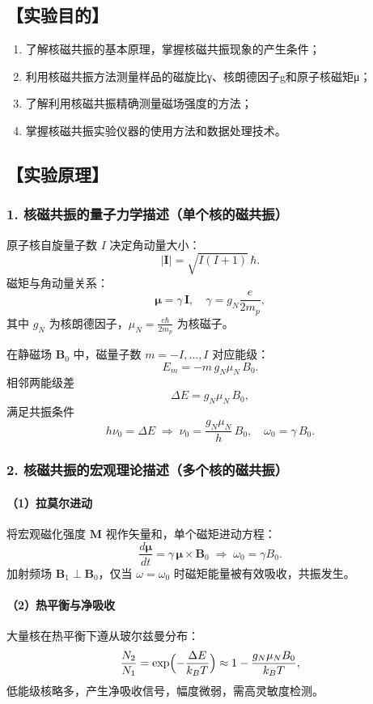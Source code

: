 \documentclass[12pt,a4paper,UTF8]{ctexart}
\begin{document}

\subsection*{【实验目的】}
\begin{enumerate}[(1)]
    \item 了解核磁共振的基本原理，掌握核磁共振现象的产生条件；
    \item 利用核磁共振方法测量样品的磁旋比γ、核朗德因子g和原子核磁矩μ；
    \item 了解利用核磁共振精确测量磁场强度的方法；
    \item 掌握核磁共振实验仪器的使用方法和数据处理技术。
\end{enumerate}

\subsection*{【实验原理】}
\subsubsection*{1. 核磁共振的量子力学描述（单个核的磁共振）}
原子核自旋量子数 \(I\) 决定角动量大小：
\[
|\mathbf{I}| = \sqrt{I(I+1)}\,\hbar.
\]
磁矩与角动量关系：
\[
\boldsymbol{\mu} = \gamma\,\mathbf{I}, 
\quad \gamma = g_N\frac{e}{2m_p},
\]
其中 \(g_N\) 为核朗德因子，\(\mu_N=\tfrac{e\hbar}{2m_p}\) 为核磁子。  

在静磁场 \(\mathbf{B}_0\) 中，磁量子数 \(m=-I,\dots,I\) 对应能级：
\[
E_m = -m\,g_N\mu_N\,B_0.
\]
相邻两能级差
\[
\Delta E = g_N\mu_N\,B_0,
\]
满足共振条件
\[
h\nu_0 = \Delta E
\;\Longrightarrow\;
\nu_0 = \frac{g_N\mu_N}{h}\,B_0,
\quad
\omega_0 = \gamma\,B_0.
\]

\subsubsection*{2. 核磁共振的宏观理论描述（多个核的磁共振）}
\paragraph{（1）拉莫尔进动}
将宏观磁化强度 \(\mathbf{M}\) 视作矢量和，单个磁矩进动方程：
\[
\frac{d\boldsymbol{\mu}}{dt} = \gamma\,\boldsymbol{\mu}\times\mathbf{B}_0
\;\Longrightarrow\;
\omega_0=\gamma B_0.
\]
加射频场 \(\mathbf{B}_1\perp\mathbf{B}_0\)，仅当 \(\omega=\omega_0\) 时磁矩能量被有效吸收，共振发生。

\paragraph{（2）热平衡与净吸收}
大量核在热平衡下遵从玻尔兹曼分布：
\[
\frac{N_2}{N_1}
=\exp\Bigl(-\frac{\Delta E}{k_BT}\Bigr)
\approx1-\frac{g_N\mu_NB_0}{k_BT},
\]
低能级核略多，产生净吸收信号，幅度微弱，需高灵敏度检测。
\end{document}
